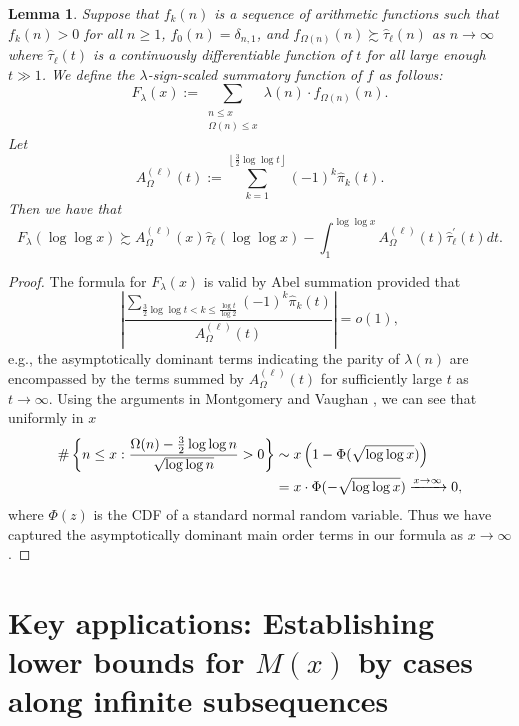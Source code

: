 \documentclass[11pt,reqno,a4letter]{article}
\numberwithin{figure}{section}
\numberwithin{table}{section}
\newcommand{\floor}[1]{\left\lfloor #1 \right\rfloor}
\theoremstyle{plain}
\newtheorem{lemma}[theorem]{Lemma}
\numberwithin{theorem}{section}
\theoremstyle{definition}
\begin{document}
\begin{lemma} 
\label{lemma_CLT_and_AbelSummation} 
Suppose that $f_k(n)$ is a sequence of arithmetic functions 
such that $f_k(n) > 0$ for all $n \geq 1$, $f_0(n) = \delta_{n,1}$, and 
$f_{\Omega(n)}(n) \succsim \widehat{\tau}_{\ell}(n)$ as $n \rightarrow \infty$ where 
$\widehat{\tau}_{\ell}(t)$ is a continuously differentiable function of $t$ for all 
large enough $t \gg 1$.  
We define the $\lambda$-sign-scaled summatory function of $f$ as follows: 
\[
F_{\lambda}(x) := \sum_{\substack{n \leq x \\ \Omega(n) \leq x}} 
     \lambda(n) \cdot f_{\Omega(n)}(n). 
\]
Let 
\[
A_{\Omega}^{(\ell)}(t) := \sum_{k=1}^{\floor{\frac{3}{2} \log\log t}} (-1)^k \widehat{\pi}_k(t). 
\]
Then we have that 
\[
F_{\lambda}(\log\log x) \succsim A_{\Omega}^{(\ell)}(x) \widehat{\tau}_{\ell}(\log\log x) - 
     \int_1^{\log\log x} 
     A_{\Omega}^{(\ell)}(t) \widehat{\tau}_{\ell}^{\prime}(t) dt. 
\]
\end{lemma}
\begin{proof} 
The formula for $F_{\lambda}(x)$ is valid by Abel summation provided that 
\[
\left\lvert \frac{\displaystyle\sum\limits_{\frac{3}{2} \log\log t < k \leq \frac{\log t}{\log 2}} 
     (-1)^k \widehat{\pi}_k(t)}{A_{\Omega}^{(\ell)}(t)}\right\rvert = o(1), 
\]
e.g., the asymptotically dominant terms indicating the parity of 
$\lambda(n)$ are encompassed by the terms summed by $A_{\Omega}^{(\ell)}(t)$ for 
sufficiently large $t$ as $t \rightarrow \infty$. 
Using the arguments in Montgomery and Vaughan \cite[\S 7; Thm.\ 7.21]{MV}, we can see that 
uniformly in $x$ 
\begin{align} 
\label{eqn_ProbCLT_for_Omegan_cited_result} 
\#\left\{n \leq x: \frac{\Omega(n) - \frac{3}{2}\log\log n}{\sqrt{\log\log n}} > 0\right\} & \sim
     x \left(1-\Phi(\sqrt{\log\log x})\right) \\ 
\notag 
     & = x \cdot \Phi(-\sqrt{\log\log x}) \xrightarrow{x \rightarrow \infty} 0, 
\end{align} 
where $\Phi(z)$ is the CDF of a standard normal random variable. 
Thus we have captured the asymptotically dominant main order terms in our formula as 
$x \rightarrow \infty$. 
\end{proof} 

\newpage
\section{Key applications: Establishing lower bounds for $M(x)$ by cases along infinite subsequences} 
\label{Section_KeyApplications} 
\end{document}
